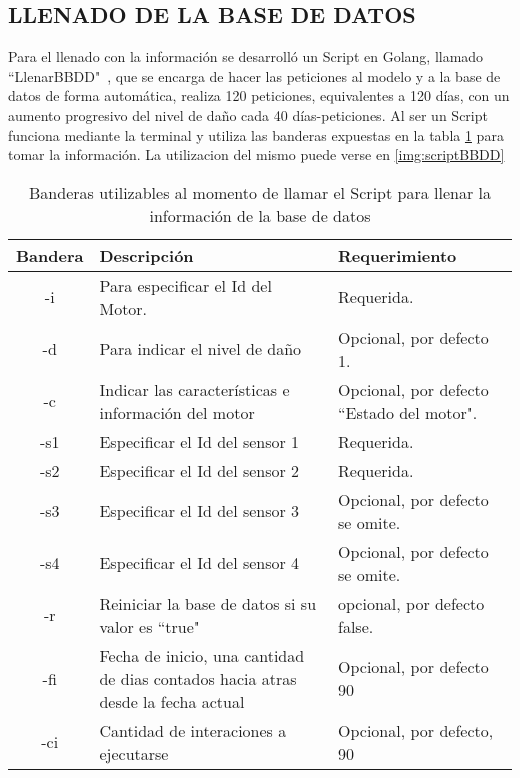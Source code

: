 \subsection{LLENADO DE LA BASE DE DATOS}
    Para el llenado con la información se desarrolló un Script en Golang,
    llamado ``LlenarBBDD"\ , que
    se encarga de hacer las peticiones al modelo y a la base de datos de forma
    automática, realiza 120 peticiones, equivalentes a 120 días, con un aumento
    progresivo del nivel de daño cada 40 días-peticiones. Al ser un Script funciona
    mediante la terminal y utiliza las banderas expuestas en la tabla
    \ref{tab:BanderasLLenadoBBDD} para tomar la información. La utilizacion del
    mismo puede verse en \ref{img:scriptBBDD}

\begin{table}[ht]
        \begin{center}
        \caption[Banderas Script para el llenado de la BBDD]{
        Banderas utilizables al momento de llamar el Script para llenar la información
        de la base de datos}
        \label{tab:BanderasLLenadoBBDD}

            \vspace{0.3cm}
            \begin{tabular}{|c|p{7cm}|p{5cm}|}
                \hline
                Bandera & Descripción & Requerimiento \\\hline
                \hline
                -i & Para especificar el Id del Motor. & Requerida.\\\hline
                -d & Para indicar el nivel de daño  & Opcional, por defecto 1.\\\hline
                -c & Indicar las características e información del motor & Opcional, por defecto ``Estado del motor".\\\hline
                -s1& Especificar el Id del sensor 1 &Requerida.\\\hline
                -s2& Especificar el Id del sensor 2 &Requerida.\\\hline
                -s3& Especificar el Id del sensor 3 & Opcional, por defecto se omite.\\\hline
                -s4& Especificar el Id del sensor 4  &Opcional, por defecto se omite.\\\hline
                -r & Reiniciar la base de datos si su valor es ``true"& opcional, por defecto false.\\\hline
                -fi& Fecha de inicio, una cantidad de dias contados hacia atras desde la fecha actual& Opcional, por defecto 90\\\hline
                -ci& Cantidad de interaciones a ejecutarse&Opcional, por defecto, 90
                \\\hline
            \end{tabular}
        \end{center}
    \end{table}

